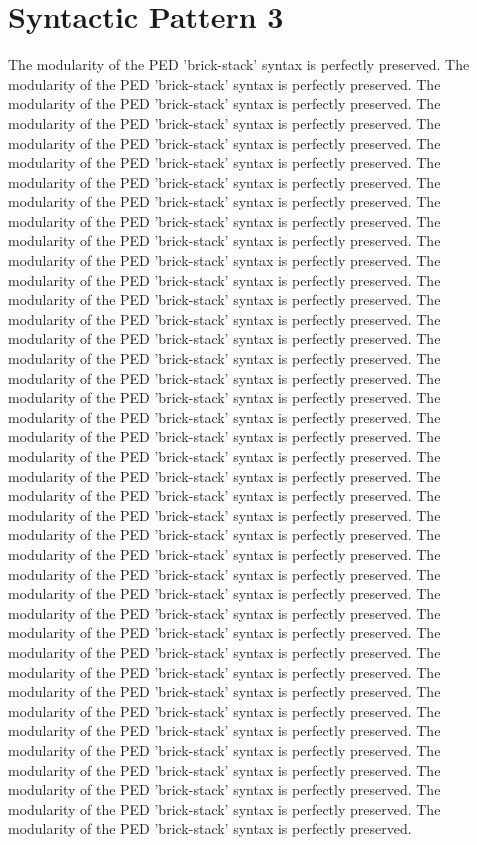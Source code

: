 \section{Syntactic Pattern 3}
The modularity of the PED 'brick-stack' syntax is perfectly preserved. The modularity of the PED 'brick-stack' syntax is perfectly preserved. The modularity of the PED 'brick-stack' syntax is perfectly preserved. The modularity of the PED 'brick-stack' syntax is perfectly preserved. The modularity of the PED 'brick-stack' syntax is perfectly preserved. The modularity of the PED 'brick-stack' syntax is perfectly preserved. The modularity of the PED 'brick-stack' syntax is perfectly preserved. The modularity of the PED 'brick-stack' syntax is perfectly preserved. The modularity of the PED 'brick-stack' syntax is perfectly preserved. The modularity of the PED 'brick-stack' syntax is perfectly preserved. The modularity of the PED 'brick-stack' syntax is perfectly preserved. The modularity of the PED 'brick-stack' syntax is perfectly preserved. The modularity of the PED 'brick-stack' syntax is perfectly preserved. The modularity of the PED 'brick-stack' syntax is perfectly preserved. The modularity of the PED 'brick-stack' syntax is perfectly preserved. The modularity of the PED 'brick-stack' syntax is perfectly preserved. The modularity of the PED 'brick-stack' syntax is perfectly preserved. The modularity of the PED 'brick-stack' syntax is perfectly preserved. The modularity of the PED 'brick-stack' syntax is perfectly preserved. The modularity of the PED 'brick-stack' syntax is perfectly preserved. The modularity of the PED 'brick-stack' syntax is perfectly preserved. The modularity of the PED 'brick-stack' syntax is perfectly preserved. The modularity of the PED 'brick-stack' syntax is perfectly preserved. The modularity of the PED 'brick-stack' syntax is perfectly preserved. The modularity of the PED 'brick-stack' syntax is perfectly preserved. The modularity of the PED 'brick-stack' syntax is perfectly preserved. The modularity of the PED 'brick-stack' syntax is perfectly preserved. The modularity of the PED 'brick-stack' syntax is perfectly preserved. The modularity of the PED 'brick-stack' syntax is perfectly preserved. The modularity of the PED 'brick-stack' syntax is perfectly preserved. The modularity of the PED 'brick-stack' syntax is perfectly preserved. The modularity of the PED 'brick-stack' syntax is perfectly preserved. The modularity of the PED 'brick-stack' syntax is perfectly preserved. The modularity of the PED 'brick-stack' syntax is perfectly preserved. The modularity of the PED 'brick-stack' syntax is perfectly preserved. The modularity of the PED 'brick-stack' syntax is perfectly preserved. The modularity of the PED 'brick-stack' syntax is perfectly preserved. The modularity of the PED 'brick-stack' syntax is perfectly preserved. The modularity of the PED 'brick-stack' syntax is perfectly preserved. The modularity of the PED 'brick-stack' syntax is perfectly preserved. 


